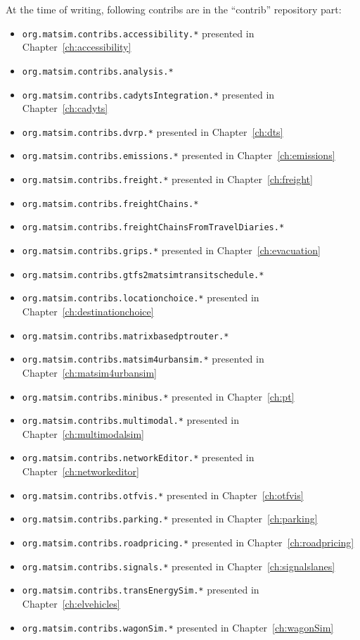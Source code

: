 At the time of writing, following contribs are in the ``contrib'' repository part:
\begin{itemize}\styleItemize
\item \lstinline{org.matsim.contribs.accessibility.*} presented in Chapter~\ref{ch:accessibility}
\item \lstinline{org.matsim.contribs.analysis.*}
\item \lstinline{org.matsim.contribs.cadytsIntegration.*} presented in Chapter~\ref{ch:cadyts}
\item \lstinline{org.matsim.contribs.dvrp.*} presented in Chapter~\ref{ch:dts}
\item \lstinline{org.matsim.contribs.emissions.*} presented in Chapter~\ref{ch:emissions}
\item \lstinline{org.matsim.contribs.freight.*} presented in Chapter~\ref{ch:freight}
\item \lstinline{org.matsim.contribs.freightChains.*}
\item \lstinline{org.matsim.contribs.freightChainsFromTravelDiaries.*}
\item \lstinline{org.matsim.contribs.grips.*} presented in Chapter~\ref{ch:evacuation}
\item \lstinline{org.matsim.contribs.gtfs2matsimtransitschedule.*} 
\item \lstinline{org.matsim.contribs.locationchoice.*} presented in Chapter~\ref{ch:destinationchoice}
\item \lstinline{org.matsim.contribs.matrixbasedptrouter.*}
\item \lstinline{org.matsim.contribs.matsim4urbansim.*} presented in Chapter~\ref{ch:matsim4urbansim}
\item \lstinline{org.matsim.contribs.minibus.*} presented in Chapter~\ref{ch:pt}
\item \lstinline{org.matsim.contribs.multimodal.*} presented in Chapter~\ref{ch:multimodalsim}
\item \lstinline{org.matsim.contribs.networkEditor.*} presented in Chapter~\ref{ch:networkeditor}
\item \lstinline{org.matsim.contribs.otfvis.*} presented in Chapter~\ref{ch:otfvis}
\item \lstinline{org.matsim.contribs.parking.*} presented in Chapter~\ref{ch:parking}
\item \lstinline{org.matsim.contribs.roadpricing.*} presented in Chapter~\ref{ch:roadpricing}
\item \lstinline{org.matsim.contribs.signals.*} presented in Chapter~\ref{ch:signalslanes}
\item \lstinline{org.matsim.contribs.transEnergySim.*} presented in Chapter~\ref{ch:elvehicles}
\item \lstinline{org.matsim.contribs.wagonSim.*} presented in Chapter~\ref{ch:wagonSim}
\end{itemize}

